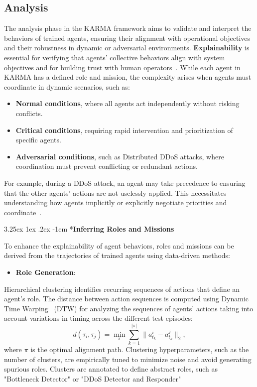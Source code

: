\documentclass[conference]{IEEEtran}
\makeatletter
\renewcommand\paragraph{\@startsection{paragraph}{5}{\z@}%
  {3.25ex \@plus1ex \@minus.2ex}%
  {-1em}%
  {\normalfont\normalsize\bfseries}}
\makeatother
\begin{document}
\subsection{Analysis}
\label{sec:analysis}

The analysis phase in the KARMA framework aims to validate and interpret the behaviors of trained agents, ensuring their alignment with operational objectives and their robustness in dynamic or adversarial environments. \textbf{Explainability} is essential for verifying that agents' collective behaviors align with system objectives and for building trust with human operators~\cite{biran2017explanation, guidotti2018survey}. While each agent in KARMA has a defined role and mission, the complexity arises when agents must coordinate in dynamic scenarios, such as:
\begin{itemize}
    \item \textbf{Normal conditions}, where all agents act independently without risking conflicts.
    \item \textbf{Critical conditions}, requiring rapid intervention and prioritization of specific agents.
    \item \textbf{Adversarial conditions}, such as Distributed DDoS attacks, where coordination must prevent conflicting or redundant actions.
\end{itemize}

For example, during a DDoS attack, an agent may take precedence to ensuring that the other agents' actions are not uselessly applied. This necessitates understanding how agents implicitly or explicitly negotiate priorities and coordinate~\cite{Shoham2009MAS}.

\paragraph*{\textbf{Inferring Roles and Missions}}

To enhance the explainability of agent behaviors, roles and missions can be derived from the trajectories of trained agents using data-driven methods:

\begin{itemize}
    \item \textbf{Role Generation}:
\end{itemize}

\noindent Hierarchical clustering identifies recurring sequences of actions that define an agent's role. The distance between action sequences is computed using Dynamic Time Warping~\cite{berndt1994using} (DTW) for analyzing the sequences of agents' actions taking into account variations in timing across the different test episodes:
\[
d(\tau_i, \tau_j) = \min_{\pi} \sum_{k=1}^{|\pi|} \|a_{t_k}^i - a_{t_k}^j\|_2,
\]
where $\pi$ is the optimal alignment path. Clustering hyperparameters, such as the number of clusters, are empirically tuned to minimize noise and avoid generating spurious roles. Clusters are annotated to define abstract roles, such as "Bottleneck Detector" or "DDoS Detector and Responder"
\end{document}
